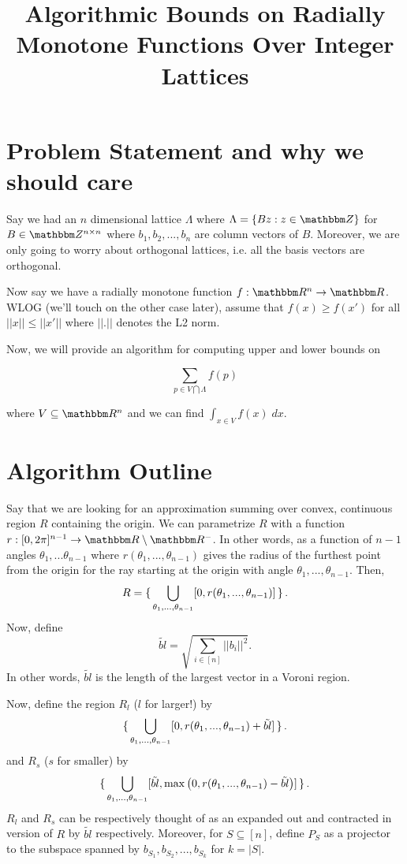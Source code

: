 \documentclass[12pt]{article}
\begin{document}
\newcommand{\biggestvec}{\tilde{bl}}
\begin{titlepage}
\title{Algorithmic Bounds on Radially Monotone Functions Over Integer Lattices}
\end{titlepage}


\section*{Problem Statement and why we should care}
Say we had an $n$ dimensional lattice $\Lambda$ where
$
	\Lambda = \{B{z} : {z} \in \Z \}
$
for $B \in \Z^{n \times n}$ where $b_1, b_2, ..., b_n$ are column vectors of $B$.
Moreover, we are only going to worry about orthogonal lattices, i.e. all the basis vectors are orthogonal.

Now say we have a radially monotone function $f : \R^n \rightarrow \R$.
WLOG (we'll touch on the other case later), assume that $f(x) \geq f(x')$ for all $||x|| \leq ||x'||$ where $||.||$ denotes
the L2 norm.

Now, we will provide an algorithm for computing upper and lower bounds on 

$$
	\sum_{p \in V \bigcap \Lambda} f(p)
$$

where $V \subseteq \R^n$ and we can find $\int_{x \in V} f(x) \; dx$.


\section*{Algorithm Outline}
Say that we are looking for an approximation summing over convex, continuous region $R$ containing the origin.
We can parametrize $R$ with a function $r : [0, 2\pi]^{n-1} \rightarrow \R \setminus \R^-$.
In other words, 
as a function of $n - 1$ angles $\theta_1, ... \theta_{n-1}$ where $r(\theta_1, ..., \theta_{n-1})$ gives the radius 
of the furthest point from the origin for the ray starting at the origin with angle $\theta_1, ..., \theta_{n-1}$.
Then,
$$
	R = \set{ \bigcup_{\theta_1, ..., \theta_{n-1}} [0, r(\theta_1, ..., \theta_{n-1})] }.
$$
Now, define 
$$
	\biggestvec = \sqrt{\sum_{i \in [n]} ||b_i||^2}.
$$
In other words, $\biggestvec$ is the length of the largest vector in a Voroni region.

Now, define the region $R_l$ ($l$ for larger!) by
$$
	\set{ \bigcup_{\theta_1, ..., \theta_{n-1}} [0, r(\theta_1, ..., \theta_{n-1}) + \biggestvec] }.
$$
and $R_s$ ($s$ for smaller) by 
$$
	\set{ \bigcup_{\theta_1, ..., \theta_{n-1}} [\biggestvec, \max\left(0, r(\theta_1, ..., \theta_{n-1}) - \biggestvec\right)] }.
$$
$R_l$ and $R_s$ can be respectively thought of as an expanded out and contracted in version of $R$
by $\biggestvec$ respectively.
Moreover, for $S \subseteq [n]$, define $P_S$ as a projector to the subspace spanned by $b_{S_1}, b_{S_2}, ..., b_{S_k}$ for
$k = |S|$.
\end{document}
